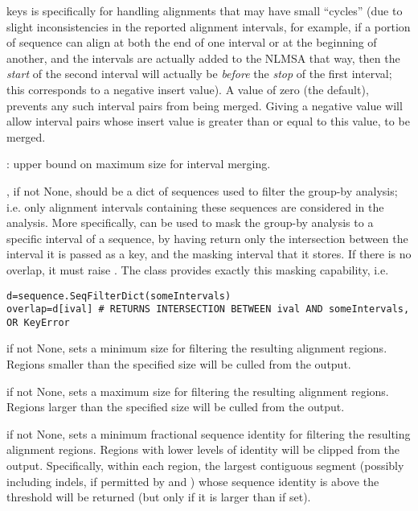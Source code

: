 \documentclass{howto}
\begin{document}
\begin{funcdesc}{keys}
   is specifically for handling
  alignments that may have small ``cycles'' (due to slight inconsistencies
  in the reported alignment intervals, for example, if a portion of sequence
  can align at both the end of one interval or at the beginning of another, and
  the intervals are actually added to the NLMSA that way, then the {\em start}
  of the second interval will actually be {\em before} the {\em stop} of 
  the first interval; this corresponds to a negative insert value).  A
   value of zero (the default), prevents any such interval
  pairs from being merged.  Giving a negative  value will allow
  interval pairs whose insert value is greater than or equal to this value, 
  to be merged.

  : upper bound on maximum size for interval merging.

  , if not None, should be a dict of sequences
  used to filter the group-by analysis; i.e. only alignment intervals 
  containing these sequences are considered in the analysis.  More
  specifically,  can be used to mask the group-by analysis
  to a specific interval of a sequence, by having 
  return only the intersection between the interval it is passed as a key,
  and the masking interval that it stores.  If there is no overlap, it
  must raise .  The  class
  provides exactly this masking capability, i.e.
\begin{verbatim}
d=sequence.SeqFilterDict(someIntervals)
overlap=d[ival] # RETURNS INTERSECTION BETWEEN ival AND someIntervals, OR KeyError
\end{verbatim}
   if not None, sets a minimum size for filtering the resulting
  alignment regions.  Regions smaller than the specified size will be culled
  from the output.  

   if not None, sets a maximum size for filtering the resulting
  alignment regions.  Regions larger than the specified size will be culled
  from the output.  

   if not None, sets a minimum fractional sequence identity
  for filtering the resulting alignment regions.  Regions with lower levels
  of identity will be clipped from the output.  Specifically, within each
  region, the largest contiguous segment (possibly including indels, if
  permitted by  and ) whose sequence identity is above the
  threshold will be returned (but only if it is larger than 
  if set).  


\end{funcdesc}
\end{document}
